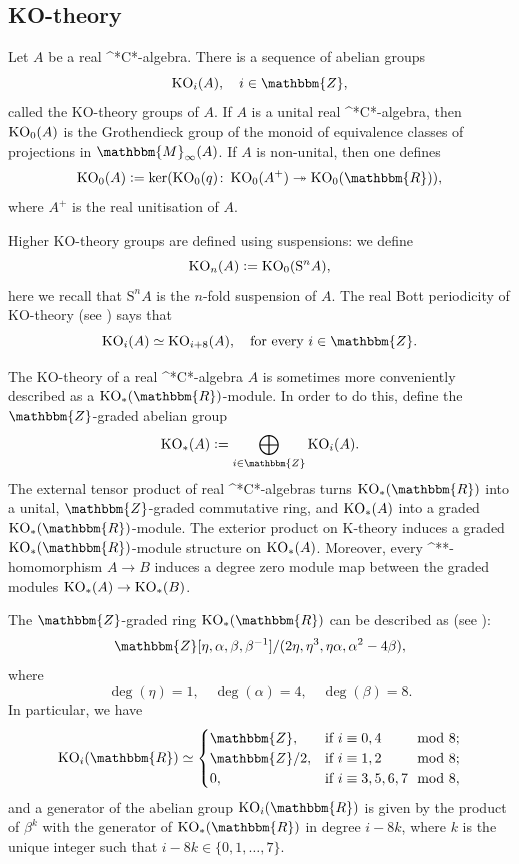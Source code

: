 \documentclass{amsart}
\numberwithin{figure}{section}
\numberwithin{equation}{section}
\numberwithin{table}{section}
\theoremstyle{plain}
\theoremstyle{definition}
\theoremstyle{remark}
\theoremstyle{nonumber}
\newcommand{\Z}{\mathbb{Z}}
\newcommand{\R}{\mathbb{R}}
\newcommand{\Mat}{\mathbb{M}}
\newcommand{\KO}{\relax\ifmmode\operatorname{KO}\else\textup{KO}\fi}
\newcommand{\st}{\relax\ifmmode{}^*\else{}\textup{*}\fi}
\newcommand{\Cst}{\relax\ifmmode\mathrm{C}^*\else\textup{C*}\fi}
\newcommand{\defeq}{\mathrel{\vcentcolon=}}
\renewcommand{\mathbb}{\mathbbm} %
\begin{document}
\subsection{\KO-theory}
Let \( A \) be a real \Cst-algebra. There is a sequence of abelian groups
\[ 
  \KO_i(A),\quad i\in\Z,
\]
called the KO-theory groups of \( A \). 
If \( A \) is a unital real
\Cst-algebra, then \( \KO_0(A) \) is the Grothendieck group of the monoid
of equivalence classes of projections in \( \Mat_{\infty}(A) \). If \( A \)
is non-unital, then one defines
\[ 
  \KO_0(A)\defeq \ker(\KO_0(q)\colon \KO_0(A^+)\twoheadrightarrow
  \KO_0(\R)),
\]
where \( A^+ \) is the real unitisation of \( A \).

Higher KO-theory groups are defined using suspensions: we define
\[
  \KO_n(A)\defeq \KO_0(\mathrm{S}^nA),
\]
here we recall that \( \mathrm{S}^nA \) is  
the \( n \)-fold suspension of \( A \). 
The real Bott periodicity of KO-theory (see
)
says that
\[ 
  \KO_i(A)\simeq\KO_{i+8}(A),\quad \text{for every \( i\in \Z \)}. 
\]

The KO-theory of a real \Cst-algebra \( A \) is sometimes more conveniently
described as a \( \KO_*(\R) \)-module. In order to do this,
define the \( \Z \)-graded abelian group  
\[
  \KO_*(A)\defeq \bigoplus_{i\in\Z}\KO_i(A).
\]
The external tensor product of real \Cst-algebras turns \(
\KO_*(\R) \) into a unital, \( \Z \)-graded commutative ring, and \(
\KO_*(A) \) into a graded \( \KO_*(\R) \)-module.  
The exterior product on K-theory induces a graded \( \KO_*(\R)
\)-module structure on \( \KO_*(A) \). Moreover, every \st-homomorphism 
$A\to B$
induces a degree zero module map between the graded modules 
\( \KO_*(A) \to\KO_*(B) \).

The \( \Z \)-graded 
ring \( \KO_*(\R) \) can be described as (see 
):
\begin{equation}\label{eq:KO-ring_of_R}
  \Z[\eta,\alpha,\beta,\beta^{-1}]/(2\eta,\eta^3,\eta\alpha,\alpha^2-4\beta),
\end{equation} 
where
\[ 
  \deg(\eta)=1,\quad\deg(\alpha)=4,\quad\deg(\beta)=8.
\]
In particular, we have
\[ 
  \KO_i(\R)\simeq\begin{cases} 
  \Z, & \text{if}\ i\equiv 0,4\hphantom{,6,7}\mod 8;\\
  \Z/2, & \text{if}\ i\equiv 1,2\hphantom{,6,7}\mod 8;\\
  0, & \text{if}\ i\equiv 3,5,6,7 \mod 8,
  \end{cases}
\]
and a generator of the abelian group \( \KO_i(\R) \) is given by the
product of \( \beta^k \) with the generator of \( \KO_*(\R) \)  
in degree \( i-8k \), where \( k
\) is the unique integer such that \( i-8k\in\{0,1,\dots,7\} \).
\end{document}
